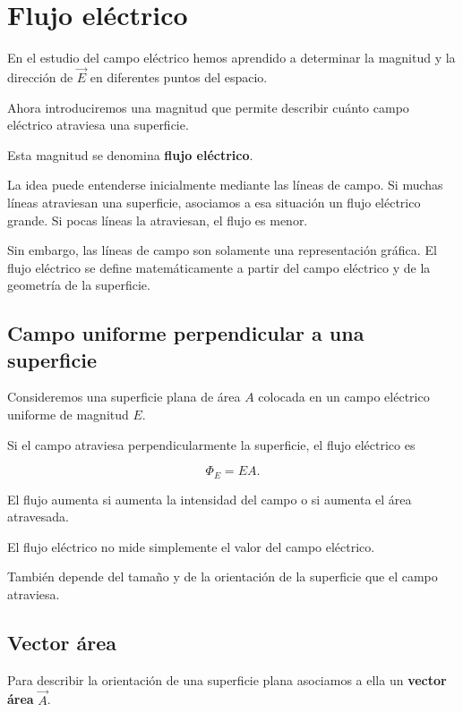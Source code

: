 \section{Flujo eléctrico}

En el estudio del campo eléctrico hemos aprendido a determinar la magnitud y la
dirección de \(\vec E\) en diferentes puntos del espacio.

Ahora introduciremos una magnitud que permite describir cuánto campo eléctrico
atraviesa una superficie.

Esta magnitud se denomina \textbf{flujo eléctrico}.

La idea puede entenderse inicialmente mediante las líneas de campo. Si muchas líneas
atraviesan una superficie, asociamos a esa situación un flujo eléctrico grande. Si pocas
líneas la atraviesan, el flujo es menor.

Sin embargo, las líneas de campo son solamente una representación gráfica. El flujo
eléctrico se define matemáticamente a partir del campo eléctrico y de la geometría de
la superficie.


\subsection{Campo uniforme perpendicular a una superficie}

Consideremos una superficie plana de área \(A\) colocada en un campo eléctrico
uniforme de magnitud \(E\).

Si el campo atraviesa perpendicularmente la superficie, el flujo eléctrico es

\[
\boxed{\Phi_E=EA}.
\]

El flujo aumenta si aumenta la intensidad del campo o si aumenta el área atravesada.

\begin{idea}

El flujo eléctrico no mide simplemente el valor del campo eléctrico.

También depende del tamaño y de la orientación de la superficie que el campo
atraviesa.

\end{idea}


\subsection{Vector área}

Para describir la orientación de una superficie plana asociamos a ella un
\textbf{vector área} \(\vec A\).

